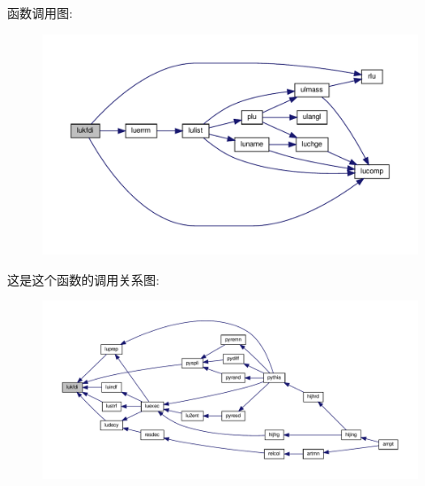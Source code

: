 函数调用图\+:
\nopagebreak
\begin{figure}[H]
\begin{center}
\leavevmode
\includegraphics[width=350pt]{lukfdi_8f90_acb067c61a00a25ea88d92d4db611b7b7_cgraph}
\end{center}
\end{figure}
这是这个函数的调用关系图\+:
\nopagebreak
\begin{figure}[H]
\begin{center}
\leavevmode
\includegraphics[width=350pt]{lukfdi_8f90_acb067c61a00a25ea88d92d4db611b7b7_icgraph}
\end{center}
\end{figure}
